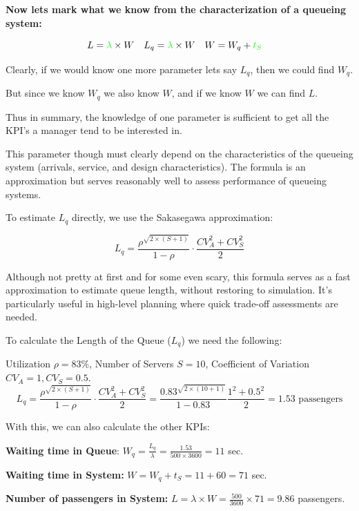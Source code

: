 \documentclass[
  letterpaper,
  DIV=11,
  numbers=noendperiod]{scrartcl}
\begin{document}
\textbf{Now lets mark what we know from the characterization of a
queueing system:}

\[
L=\textcolor{green}{\lambda} \times W \quad L_q=\textcolor{green}{\lambda} \times W \quad W= W_q + \textcolor{green}{t_S} \quad
\]

Clearly, if we would know one more parameter lets say \(L_q\), then we
could find \(W_q\).

But since we know \(W_q\) we also know \(W\), and if we know \(W\) we
can find \(L\).

Thus in summary, the knowledge of one parameter is sufficient to get all
the KPI's a manager tend to be interested in.

This parameter though must clearly depend on the characteristics of the
queueing system (arrivals, service, and design characteristics). The
formula is an approximation but serves reasonably well to assess
performance of queueing systems.

To estimate \(L_q\) directly, we use the Sakasegawa approximation:

\[
L_q = \frac{\rho^{\sqrt{2 \times (S+1)}}}{1 - \rho} \cdot \frac{CV_A^2 + CV_S^2}{2}
\]

Although not pretty at first and for some even scary, this formula
serves as a fast approximation to estimate queue length, without
restoring to simulation. It's particularly useful in high-level planning
where quick trade-off assessments are needed.

\begin{tcolorbox}[enhanced jigsaw, colbacktitle=quarto-callout-note-color!10!white, leftrule=.75mm, breakable, bottomtitle=1mm, title=\textcolor{quarto-callout-note-color}{\faInfo}\hspace{0.5em}{At the Airport- Barcelona Prat}, opacitybacktitle=0.6, toptitle=1mm, arc=.35mm, colback=white, rightrule=.15mm, left=2mm, colframe=quarto-callout-note-color-frame, titlerule=0mm, toprule=.15mm, bottomrule=.15mm, opacityback=0, coltitle=black]

To calculate the Length of the Queue (\(L_q\)) we need the following:

Utilization \(\rho=83\%\), Number of Servers \(S=10\), Coefficient of
Variation \(CV_A=1, CV_S=0.5\). \[
L_q = \frac{\rho^{\sqrt{2 \times (S+1)}}}{1 - \rho} \cdot \frac{CV_A^2 + CV_S^2}{2}=\frac{0.83^{\sqrt{2\times(10+1)}}}{1-0.83}\frac{1^2+0.5^2}{2}=1.53 \text{ passengers}
\]

With this, we can also calculate the other KPIs:

\textbf{Waiting time in Queue}:
\(W_q=\frac{L_q}{\lambda}=\frac{1.53}{500×3600}=11\) sec.

\textbf{Waiting time in System:} \(W=W_q+t_S=11+60=71\) sec.

\textbf{Number of passengers in System:}
\(L=\lambda \times W= \frac{500}{3600}\times 71= 9.86\) passengers.

\end{tcolorbox}
\end{document}
